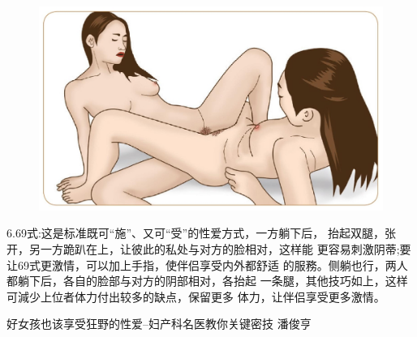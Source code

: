 \documentclass[12pt,UTF8]{ctexbook}
\begin{document}
\begin{figure}[htbp]
	\centering
	\includegraphics[width=0.7\linewidth]{12}
	\caption{}
	\label{fig:1}
\end{figure}

6.69式:这是标准既可“施”、又可“受”的性爱方式，一方躺下后，
抬起双腿，张开，另一方跪趴在上，让彼此的私处与对方的脸相对，这样能
更容易刺激阴蒂;要让69式更激情，可以加上手指，使伴侣享受内外都舒适
的服務。侧躺也行，两人都躺下后，各自的脸部与对方的阴部相对，各抬起
一条腿，其他技巧如上，这样可減少上位者体力付出较多的缺点，保留更多
体力，让伴侣享受更多激情。



\backmatter

好女孩也该享受狂野的性爱--妇产科名医教你关键密技  潘俊亨
\end{document}
